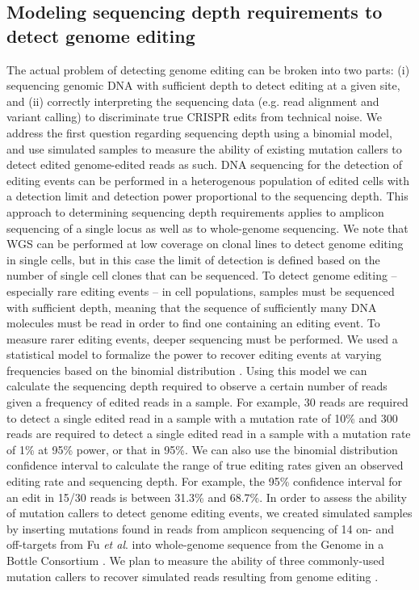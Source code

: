 \documentclass[a4paper, titlepage, openright]{book}
\begin{document}
\subsection{Modeling sequencing depth requirements to detect genome editing}
The actual problem of detecting genome editing can be broken into two parts: (i) sequencing genomic DNA with sufficient depth to detect editing at a given site, and (ii) correctly interpreting the sequencing data (e.g. read alignment and variant calling) to discriminate true CRISPR edits from technical noise. We address the first question regarding sequencing depth using a binomial model, and use simulated samples to measure the ability of existing mutation callers to detect edited genome-edited reads as such.
DNA sequencing for the detection of editing events can be performed in a heterogenous population of edited cells with a detection limit and detection power proportional to the sequencing depth. This approach to determining sequencing depth requirements applies to amplicon sequencing of a single locus as well as to whole-genome sequencing. We note that WGS can be performed at low coverage on clonal lines to detect genome editing in single cells, but in this case the limit of detection is defined based on the number of single cell clones that can be sequenced. To detect genome editing – especially rare editing events – in cell populations, samples must be sequenced with sufficient depth, meaning that the sequence of sufficiently many DNA molecules must be read in order to find one containing an editing event. To measure rarer editing events, deeper sequencing must be performed. We used a statistical model to formalize the power to recover editing events at varying frequencies based on the binomial distribution \citep{petrackova2019standardization}. Using this model we can calculate the sequencing depth required to observe a certain number of reads given a frequency of edited reads in a sample. For example, 30 reads are required to detect a single edited read in a sample with a mutation rate of 10\% and 300 reads are required to detect a single edited read in a sample with a mutation rate of 1\% at 95\% power, or that in 95\%. We can also use the binomial distribution confidence interval to calculate the range of true editing rates given an observed editing rate and sequencing depth. For example, the 95\% confidence interval for an edit in 15/30 reads is between 31.3\% and 68.7\%. In order to assess the ability of mutation callers to detect genome editing events, we created simulated samples by inserting mutations found in reads from amplicon sequencing of 14 on- and off-targets from Fu \emph{et al}. \citep{fu2014improving} into whole-genome sequence from the Genome in a Bottle Consortium \citep{zook2016extensive}. We plan to measure the ability of three commonly-used mutation callers to recover simulated reads resulting from genome editing \citep{mckenna2010genome, kim2018strelka2, koboldt2012varscan}.
\end{document}
